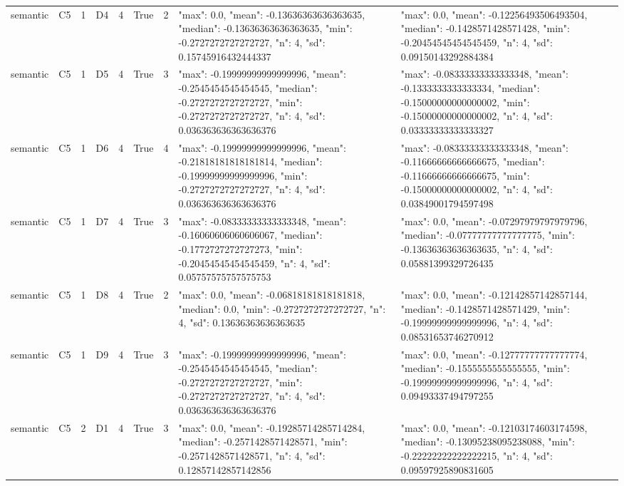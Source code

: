 \begin{tabular}{lllllllll}
semantic & C5 & 1 & D4 & 4 & True & 2 & {"max": 0.0, "mean": -0.13636363636363635, "median": -0.13636363636363635, "min": -0.2727272727272727, "n": 4, "sd": 0.15745916432444337} & {"max": 0.0, "mean": -0.12256493506493504, "median": -0.1428571428571428, "min": -0.20454545454545459, "n": 4, "sd": 0.09150143292884384} \\
semantic & C5 & 1 & D5 & 4 & True & 3 & {"max": -0.19999999999999996, "mean": -0.2545454545454545, "median": -0.2727272727272727, "min": -0.2727272727272727, "n": 4, "sd": 0.036363636363636376} & {"max": -0.08333333333333348, "mean": -0.1333333333333334, "median": -0.15000000000000002, "min": -0.15000000000000002, "n": 4, "sd": 0.03333333333333327} \\
semantic & C5 & 1 & D6 & 4 & True & 4 & {"max": -0.19999999999999996, "mean": -0.21818181818181814, "median": -0.19999999999999996, "min": -0.2727272727272727, "n": 4, "sd": 0.036363636363636376} & {"max": -0.08333333333333348, "mean": -0.11666666666666675, "median": -0.11666666666666675, "min": -0.15000000000000002, "n": 4, "sd": 0.03849001794597498} \\
semantic & C5 & 1 & D7 & 4 & True & 3 & {"max": -0.08333333333333348, "mean": -0.16060606060606067, "median": -0.1772727272727273, "min": -0.20454545454545459, "n": 4, "sd": 0.05757575757575753} & {"max": 0.0, "mean": -0.07297979797979796, "median": -0.07777777777777775, "min": -0.13636363636363635, "n": 4, "sd": 0.05881399329726435} \\
semantic & C5 & 1 & D8 & 4 & True & 2 & {"max": 0.0, "mean": -0.06818181818181818, "median": 0.0, "min": -0.2727272727272727, "n": 4, "sd": 0.13636363636363635} & {"max": 0.0, "mean": -0.12142857142857144, "median": -0.1428571428571429, "min": -0.19999999999999996, "n": 4, "sd": 0.08531653746270912} \\
semantic & C5 & 1 & D9 & 4 & True & 3 & {"max": -0.19999999999999996, "mean": -0.2545454545454545, "median": -0.2727272727272727, "min": -0.2727272727272727, "n": 4, "sd": 0.036363636363636376} & {"max": 0.0, "mean": -0.12777777777777774, "median": -0.1555555555555555, "min": -0.19999999999999996, "n": 4, "sd": 0.09493337494797255} \\
semantic & C5 & 2 & D1 & 4 & True & 3 & {"max": 0.0, "mean": -0.19285714285714284, "median": -0.2571428571428571, "min": -0.2571428571428571, "n": 4, "sd": 0.12857142857142856} & {"max": 0.0, "mean": -0.12103174603174598, "median": -0.13095238095238088, "min": -0.22222222222222215, "n": 4, "sd": 0.09597925890831605} \\

\end{tabular}
